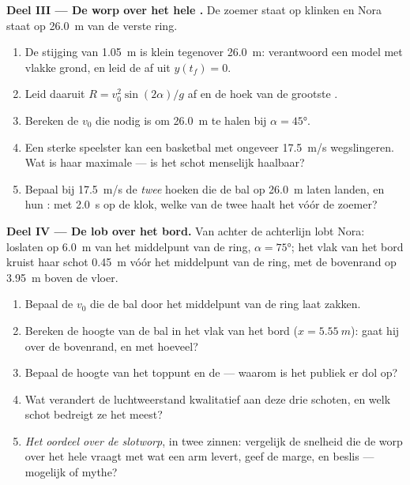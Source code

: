 \begin{problem}
\medskip\noindent\textbf{Deel III --- De worp over het hele .} De zoemer
staat op klinken en Nora staat op \qty{26.0}{m} van de verste ring.
\begin{enumerate}[resume]
  \item De stijging van \qty{1.05}{m} is klein tegenover \qty{26.0}{m}:
        verantwoord een model met vlakke grond, en leid de  af uit
        $y(t_f) = 0$.
  \item Leid daaruit $R = v_0^2\sin(2\alpha)/g$ af en de hoek van de
        grootste .
  \item Bereken de $v_0$ die nodig is om \qty{26.0}{m} te halen bij
        $\alpha = \ang{45}$.
  \item Een sterke speelster kan een basketbal met ongeveer \qty{17.5}{m/s}
        wegslingeren. Wat is haar maximale  --- is het schot menselijk
        haalbaar?
  \item Bepaal bij \qty{17.5}{m/s} de \emph{twee} hoeken die de bal op
        \qty{26.0}{m} laten landen, en hun : met \qty{2.0}{s} op
        de klok, welke van de twee haalt het vóór de zoemer?
\end{enumerate}

\medskip\noindent\textbf{Deel IV --- De lob over het bord.} Van achter de
achterlijn lobt Nora: loslaten op \qty{6.0}{m} van het middelpunt van de
ring, $\alpha = \ang{75}$; het vlak van het bord kruist haar schot
\qty{0.45}{m} vóór het middelpunt van de ring, met de bovenrand op
\qty{3.95}{m} boven de vloer.
\begin{enumerate}[resume]
  \item Bepaal de $v_0$ die de bal door het middelpunt van de ring laat
        zakken.
  \item Bereken de hoogte van de bal in het vlak van het bord
        ($x = \qty{5.55}{m}$): gaat hij over de bovenrand, en met hoeveel?
  \item Bepaal de hoogte van het toppunt en de  --- waarom is het
        publiek er dol op?
  \item Wat verandert de luchtweerstand kwalitatief aan deze drie schoten, en
        welk schot bedreigt ze het meest?
  \item \emph{Het oordeel over de slotworp}, in twee zinnen: vergelijk de
        snelheid die de worp over het hele  vraagt met wat een arm
        levert, geef de marge, en beslis --- mogelijk of mythe?
\end{enumerate}
\end{problem}
